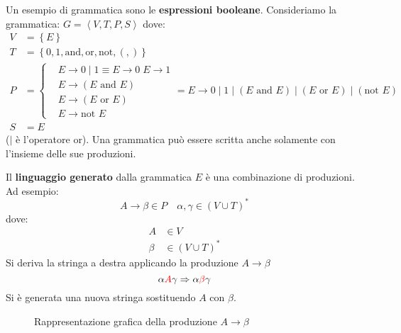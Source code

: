 \documentclass[a4paper]{article}
\begin{document}
\begin{example}
  Un esempio di grammatica sono le \textbf{espressioni booleane}.
  Consideriamo la grammatica: \( G = \left< V, T, P, S \right> \) dove:
  \[
    \begin{aligned}
      V &= \left\{ E \right\}\\
      T &= \left\{ 0, 1, \text{and}, \text{or}, \text{not}, (, ) \right\}\\
      P &= \left\{
        \begin{aligned}
          &E \to 0 \;|\; 1 \equiv E \to 0 \; E \to 1\\
          &E \to (E \text{ and } E)\\
          &E \to (E \text{ or } E)\\
          &E \to \text{not } E
        \end{aligned}
      \right. = 
      E \to 0 \;|\; 1 \;|\; (E \text{ and } E) \;|\; (E \text{ or } E) \;|\; (\text{not } E)
      \\
        S &= E
    \end{aligned}
  \] 
  (\( | \) è l'operatore or). Una grammatica può essere scritta anche solamente con
  l'insieme delle sue produzioni.

  \vspace{1em}
  \noindent
  Il \textbf{linguaggio generato} dalla grammatica \( E \) è una combinazione di
  produzioni. Ad esempio:
  \[
    A \to \beta \in P \quad \alpha, \gamma \in (V \cup T)^*
  \] 
  dove:
  \[
  \begin{aligned}
    A &\in V\\
    \beta &\in (V \cup T)^*
  \end{aligned}
  \] 
  Si deriva la stringa a destra applicando la produzione \( A \to \beta \) 
  \[
    \alpha \color{red}A\color{black} \gamma \Rightarrow \alpha \color{red}\beta\color{black} \gamma
  \] 
  Si è generata una nuova stringa sostituendo \( A \) con \( \beta \).
  \begin{figure}[H]
    \centering
    \caption{Rappresentazione grafica della produzione \( A \to \beta \)}
  \end{figure}
  \begin{figure}[H]
    \centering
\end{figure}
\end{example}
\end{document}
